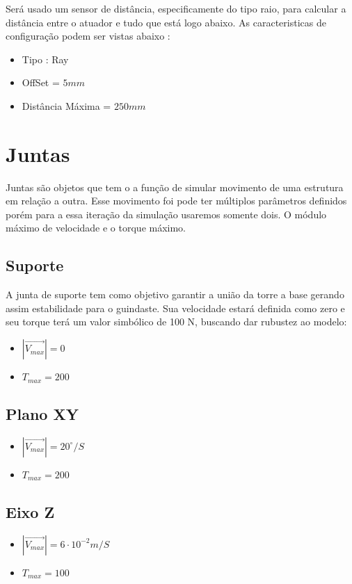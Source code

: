 \documentclass{article}
\begin{document}
            Será usado um sensor de distância, especificamente do tipo raio, para calcular a distância entre o atuador 
            e tudo que está logo abaixo. As caracteristicas de configuração podem ser vistas abaixo :
            \begin{itemize}
                \item Tipo : Ray
                \item OffSet = \(5mm\)
                \item Distância Máxima = \(250mm\)
            \end{itemize}
        
    \section{Juntas}

        Juntas são objetos que tem o a função de simular movimento de uma estrutura em relação a outra. Esse movimento foi
        pode ter múltiplos parâmetros definidos porém para a essa iteração da simulação usaremos somente dois. O módulo máximo 
        de velocidade e o torque máximo.
        \subsection{Suporte}

            A junta de suporte tem como objetivo garantir a união da torre a base gerando assim estabilidade para o guindaste. Sua velocidade estará definida como zero e seu torque
            terá um valor simbólico de 100 N, buscando dar rubustez ao modelo:
            \begin{itemize}
                \item \(\left|\vec{V_{max}}\right| = 0\)
                \item \(T_{max} = 200\)
            \end{itemize}
        \subsection{Plano XY}
            \begin{itemize}
                \item \(\left|\vec{V_{max}}\right| = 20^{\circ}/S\)
                \item \(T_{max} = 200\)
            \end{itemize}
        \subsection{Eixo Z}
            \begin{itemize}
                \item \(\left|\vec{V_{max}}\right| = 6\cdot 10^{-2} m/S\)
                \item \(T_{max} = 100\)
            \end{itemize}
\end{document}
